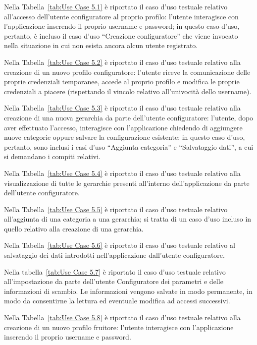 Nella Tabella~\ref{tab:Use Case 5.1} è riportato il caso d'uso testuale relativo all'accesso dell'utente configuratore al proprio profilo: l'utente interagisce con l'applicazione inserendo il proprio username e password; in questo caso d'uso, pertanto, è incluso il caso d'uso ``Creazione configuratore'' che viene invocato nella situazione in cui non esista ancora alcun utente registrato.\bigskip

Nella Tabella~\ref{tab:Use Case 5.2} è riportato il caso d'uso testuale relativo alla creazione di un nuovo profilo configuratore: l'utente riceve la comunicazione delle proprie credenziali temporanee, accede al proprio profilo e modifica le proprie credenziali a piacere (rispettando il vincolo relativo all'univocità dello username).\bigskip

Nella Tabella~\ref{tab:Use Case 5.3} è riportato il caso d'uso testuale relativo alla creazione di una nuova gerarchia da parte dell'utente configuratore: l'utente, dopo aver effettuato l'accesso, interagisce con l'applicazione chiedendo di aggiungere nuove categorie oppure salvare la configurazione esistente; in questo caso d'uso, pertanto, sono inclusi i casi d'uso ``Aggiunta categoria'' e ``Salvataggio dati'', a cui si demandano i compiti relativi.\bigskip

Nella Tabella~\ref{tab:Use Case 5.4} è riportato il caso d'uso testuale relativo alla visualizzazione di tutte le gerarchie presenti all'interno dell'applicazione da parte dell'utente configuratore.\bigskip

Nella Tabella~\ref{tab:Use Case 5.5} è riportato il caso d'uso testuale relativo all'aggiunta di una categoria a una gerarchia; si tratta di un caso d'uso incluso in quello relativo alla creazione di una gerarchia.\bigskip

Nella Tabella~\ref{tab:Use Case 5.6} è riportato il caso d'uso testuale relativo al salvataggio dei dati introdotti nell'applicazione dall'utente configuratore.\bigskip

Nella tabella~\ref{tab:Use Case 5.7} è riportato il caso d'uso testuale relativo all'impostazione da parte dell'utente Configuratore dei parametri e delle informazioni di scambio. Le informazioni vengono salvate in modo permanente, in modo da consentirne la lettura ed eventuale modifica ad accessi successivi.\bigskip

Nella Tabella~\ref{tab:Use Case 5.8} è riportato il caso d'uso testuale relativo alla creazione di un nuovo profilo fruitore: l'utente interagisce con l'applicazione inserendo il proprio username e password.\bigskip

